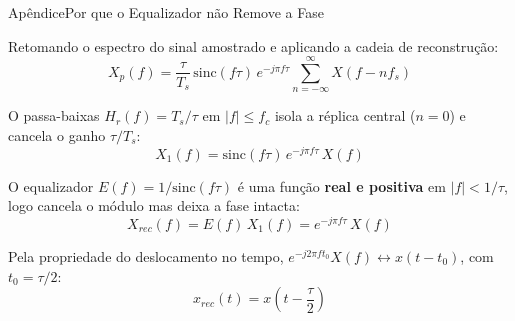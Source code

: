 \appendix

\begin{frame}{Apêndice}{Por que o Equalizador não Remove a Fase}
  \small

  Retomando o espectro do sinal amostrado e aplicando a cadeia de reconstrução:
  \begin{equation*}
    X_p(f) = \frac{\tau}{T_s}\,\mathrm{sinc}(f\tau)\,e^{-j\pi f\tau}
             \sum_{n=-\infty}^{\infty} X(f - nf_s)
  \end{equation*}

  O passa-baixas $H_r(f) = T_s/\tau$ em $|f| \leq f_c$ isola a réplica central
  ($n=0$) e cancela o ganho $\tau/T_s$:
  \begin{equation*}
    X_1(f) = \mathrm{sinc}(f\tau)\,e^{-j\pi f\tau}\,X(f)
  \end{equation*}

  O equalizador $E(f) = 1/\mathrm{sinc}(f\tau)$ é uma função
  \textbf{real e positiva} em $|f| < 1/\tau$, logo cancela o módulo mas deixa a
  fase intacta:
  \begin{equation*}
    X_{rec}(f) = E(f)\,X_1(f) = e^{-j\pi f\tau}\,X(f)
  \end{equation*}

  Pela propriedade do deslocamento no tempo,
  $e^{-j2\pi f t_0}X(f) \longleftrightarrow x(t - t_0)$, com
  $t_0 = \tau/2$:
  \begin{equation*}
    \boxed{\;x_{rec}(t) = x\!\left(t - \frac{\tau}{2}\right)\;}
  \end{equation*}

\end{frame}
